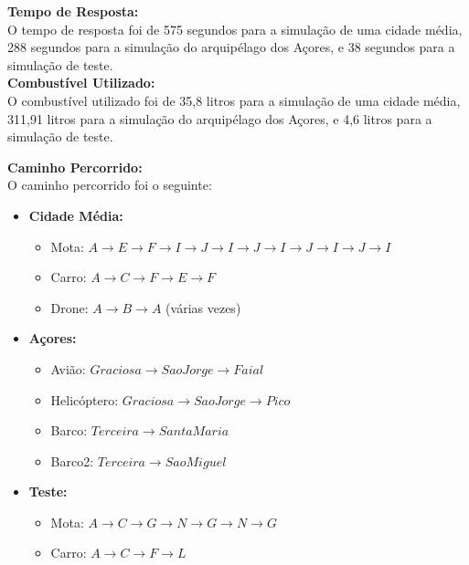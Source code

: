 \documentclass[a4paper,12pt]{scrreprt}
\begin{document}
\textbf{Tempo de Resposta:} \\
O tempo de resposta foi de 575 segundos para a simulação de uma cidade média, 288 segundos para a simulação
do arquipélago dos Açores, e 38 segundos para a simulação de teste. \\

\textbf{Combustível Utilizado:} \\
O combustível utilizado foi de 35,8 litros para a simulação de uma cidade média, 311,91 litros para a simulação
do arquipélago dos Açores, e 4,6 litros para a simulação de teste. \\

\clearpage

\textbf{Caminho Percorrido:} \\
O caminho percorrido foi o seguinte:
\begin{itemize}
    \item \textbf{Cidade Média:}
        \begin{itemize}
            \item Mota: $A \rightarrow E \rightarrow F \rightarrow I \rightarrow J \rightarrow I
             \rightarrow J \rightarrow I \rightarrow J \rightarrow I \rightarrow J \rightarrow I$ \\
            \item Carro: $A \rightarrow C \rightarrow F \rightarrow E \rightarrow F$ \\
            \item Drone: $A \rightarrow B \rightarrow A$ (várias vezes)
        \end{itemize}
    \item \textbf{Açores:}
        \begin{itemize}
            \item Avião: $Graciosa \rightarrow Sao Jorge \rightarrow Faial$ \\
            \item Helicóptero: $Graciosa \rightarrow Sao Jorge \rightarrow Pico$ \\
            \item Barco: $Terceira \rightarrow Santa Maria$ \\
            \item Barco2: $Terceira \rightarrow Sao Miguel$
        \end{itemize}
    \item \textbf{Teste:}
        \begin{itemize}
            \item Mota: $A \rightarrow C \rightarrow G \rightarrow N \rightarrow G
            \rightarrow N \rightarrow G$ \\
            \item Carro: $A \rightarrow C \rightarrow F \rightarrow L$
        \end{itemize}
\end{itemize}
\end{document}
